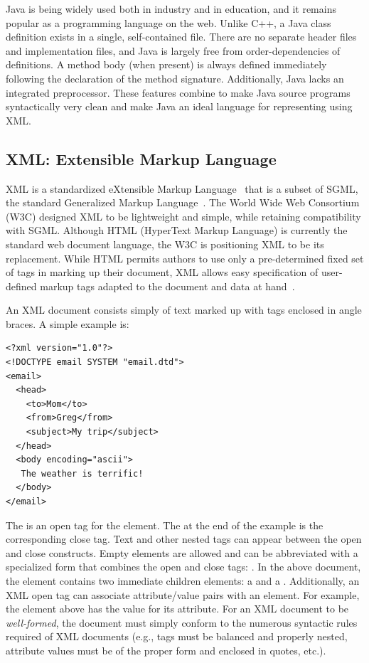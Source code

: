 \documentclass{article}
\begin{document}

Java is being widely used both in industry and in education, and it
remains popular as a programming language on the web.  Unlike C++, a
Java class definition exists in a single, self-contained file.  There
are no separate header files and implementation files, and Java is
largely free from order-dependencies of definitions.  A method body
(when present) is always defined immediately following the declaration
of the method signature.  Additionally, Java lacks an integrated
preprocessor.  These features combine to make Java source programs
syntactically very clean and make Java an ideal language for
representing using XML.

\subsection{XML: Extensible Markup Language}

XML is a standardized eXtensible Markup Language~\cite{XML} that is a
subset of SGML, the standard Generalized Markup Language~\cite{SGML}.
The World Wide Web Consortium (W3C) designed XML to be lightweight and
simple, while retaining compatibility with SGML.  Although HTML
(HyperText Markup Language) is currently the standard web document
language, the W3C is positioning XML to be its replacement.  While HTML
permits authors to use only a pre-determined fixed set of tags in
marking up their document, XML allows easy specification of user-defined
markup tags adapted to the document and data at
hand~\cite{Goosens99,Goldfarb98}.

An XML document consists simply of text marked up with tags enclosed in
angle braces.  A simple example is:

\begin{verbatim}
<?xml version="1.0"?>
<!DOCTYPE email SYSTEM "email.dtd">
<email>
  <head>
    <to>Mom</to>
    <from>Greg</from>
    <subject>My trip</subject>
  </head>
  <body encoding="ascii">
   The weather is terrific!
  </body>
</email>
\end{verbatim}

The  is an open tag for the  element.
The  at the end of the example is the corresponding
close tag.  Text and other nested tags can appear between the open and
close constructs. Empty elements are allowed and can be abbreviated with
a specialized form that combines the open and close tags:
.  In the above document, the
 element contains two immediate children elements: a
 and a .  Additionally, an XML open tag
can associate attribute/value pairs with an element.  For example, the
 element above has the value  for its
 attribute.  For an XML document to be
\emph{well-formed}, the document must simply conform to the numerous
syntactic rules required of XML documents (e.g., tags must be balanced
and properly nested, attribute values must be of the proper form and
enclosed in quotes, etc.).
\end{document}
